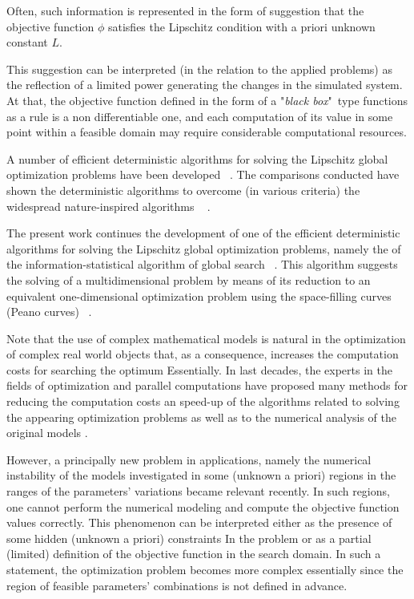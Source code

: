 \documentclass[runningheads]{llncs}
\begin{document}
Often, such information is represented in the form of suggestion that the objective function $\phi$ satisfies the Lipschitz condition with a priori unknown constant $L$.

This suggestion can be interpreted (in the relation to the applied problems) as the reflection of a limited power generating the changes in the simulated system. At that, the objective function defined in the form of a "\textit{black box}"\ type functions as a rule is a non differentiable one, and each computation of its value in some point within a feasible domain may require considerable computational resources.

A number of efficient deterministic algorithms for solving the Lipschitz global optimization problems have been developed ~\cite{Jones2009,Birect2020,Sergeyev2017}. The comparisons conducted have shown the deterministic algorithms to overcome (in various criteria) the widespread nature-inspired algorithms ~\cite{Liberti2005,Sergeyev2018,Sovrasov2019} .

The present work continues the development of one of the efficient deterministic algorithms for solving the Lipschitz global optimization problems, namely the of the information-statistical algorithm of global search ~\cite{indexMethod,strongin1978,Strongin2000}. This algorithm suggests the solving of a multidimensional problem by means of its reduction to an equivalent one-dimensional optimization problem using the space-filling curves (Peano curves) ~\cite{Sergeyev2013}. 

Note that the use of complex mathematical models is natural in the optimization of complex real world objects that, as a consequence, increases the computation costs for searching the optimum Essentially. In last decades, the experts in the fields of optimization and parallel computations have proposed many methods for reducing the computation costs an speed-up of the algorithms related to solving the appearing optimization problems \cite{Kvasov2013}  as well as to the numerical analysis of the original models \cite{Duwe2020}.

However, a principally new problem in applications, namely the numerical instability of the models investigated in some (unknown a priori) regions in the ranges of the parameters’ variations became relevant recently. In such regions, one cannot perform the numerical modeling and compute the objective function values correctly. This phenomenon can be interpreted either as the presence of some hidden (unknown a priori) constraints In the problem or as a partial (limited) definition of the objective function in the search domain. In such a statement, the optimization problem becomes more complex essentially since the region of feasible parameters’ combinations is not defined in advance.
\end{document}
